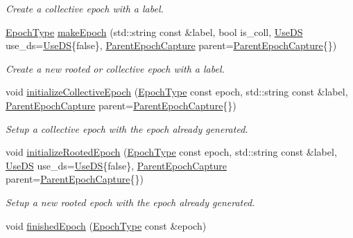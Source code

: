 \begin{DoxyCompactItemize}
\begin{DoxyCompactList}\small\item\em Create a collective epoch with a label. \end{DoxyCompactList}\item 
\hyperlink{namespacevt_a81d11b28122d43bf9834577e4a06440f}{Epoch\+Type} \hyperlink{structvt_1_1term_1_1_termination_detector_a48d9022d6bb4ff56e42ebefebe1a0586}{make\+Epoch} (std\+::string const \&label, bool is\+\_\+coll, \hyperlink{structvt_1_1term_1_1_use_d_s}{Use\+DS} use\+\_\+ds=\hyperlink{structvt_1_1term_1_1_use_d_s}{Use\+DS}\{false\}, \hyperlink{structvt_1_1term_1_1_parent_epoch_capture}{Parent\+Epoch\+Capture} parent=\hyperlink{structvt_1_1term_1_1_parent_epoch_capture}{Parent\+Epoch\+Capture}\{\})
\begin{DoxyCompactList}\small\item\em Create a new rooted or collective epoch with a label. \end{DoxyCompactList}\item 
void \hyperlink{structvt_1_1term_1_1_termination_detector_af3ca1bd9f84308f910e6c1de4b8735e6}{initialize\+Collective\+Epoch} (\hyperlink{namespacevt_a81d11b28122d43bf9834577e4a06440f}{Epoch\+Type} const epoch, std\+::string const \&label, \hyperlink{structvt_1_1term_1_1_parent_epoch_capture}{Parent\+Epoch\+Capture} parent=\hyperlink{structvt_1_1term_1_1_parent_epoch_capture}{Parent\+Epoch\+Capture}\{\})
\begin{DoxyCompactList}\small\item\em Setup a collective epoch with the epoch already generated. \end{DoxyCompactList}\item 
void \hyperlink{structvt_1_1term_1_1_termination_detector_a3148e617fe8edb264c6c709a5abf6199}{initialize\+Rooted\+Epoch} (\hyperlink{namespacevt_a81d11b28122d43bf9834577e4a06440f}{Epoch\+Type} const epoch, std\+::string const \&label, \hyperlink{structvt_1_1term_1_1_use_d_s}{Use\+DS} use\+\_\+ds=\hyperlink{structvt_1_1term_1_1_use_d_s}{Use\+DS}\{false\}, \hyperlink{structvt_1_1term_1_1_parent_epoch_capture}{Parent\+Epoch\+Capture} parent=\hyperlink{structvt_1_1term_1_1_parent_epoch_capture}{Parent\+Epoch\+Capture}\{\})
\begin{DoxyCompactList}\small\item\em Setup a new rooted epoch with the epoch already generated. \end{DoxyCompactList}\item 
void \hyperlink{structvt_1_1term_1_1_termination_detector_ad54d75c50bd3f34f30247817737bc303}{finished\+Epoch} (\hyperlink{namespacevt_a81d11b28122d43bf9834577e4a06440f}{Epoch\+Type} const \&epoch)

\end{DoxyCompactItemize}
